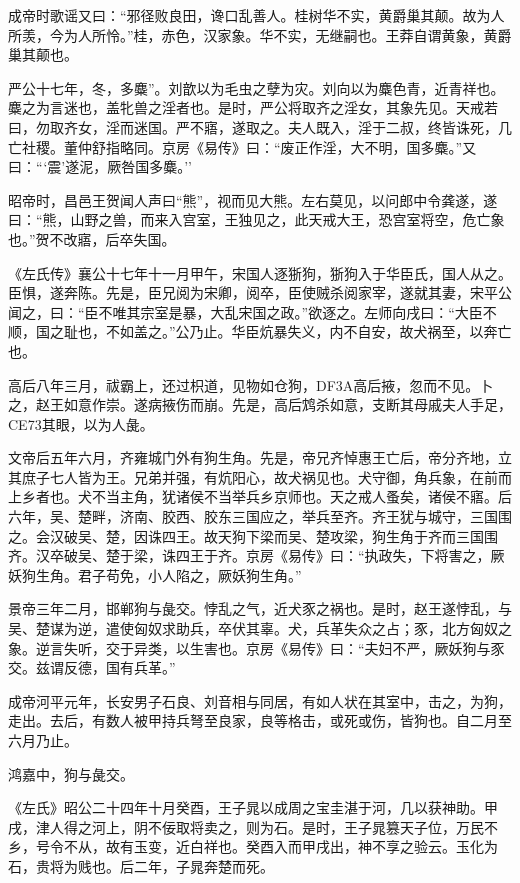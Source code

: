 \documentclass[]{article}
\begin{document}
成帝时歌谣又曰：``邪径败良田，谗口乱善人。桂树华不实，黄爵巢其颠。故为人所羡，今为人所怜。''桂，赤色，汉家象。华不实，无继嗣也。王莽自谓黄象，黄爵巢其颠也。

严公十七年，冬，多麋''。刘歆以为毛虫之孽为灾。刘向以为麋色青，近青祥也。麋之为言迷也，盖牝兽之淫者也。是时，严公将取齐之淫女，其象先见。天戒若曰，勿取齐女，淫而迷国。严不寤，遂取之。夫人既入，淫于二叔，终皆诛死，几亡社稷。董仲舒指略同。京房《易传》曰：``废正作淫，大不明，国多麋。''又曰：```震'遂泥，厥咎国多麋。''

昭帝时，昌邑王贺闻人声曰``熊''，视而见大熊。左右莫见，以问郎中令龚遂，遂曰：``熊，山野之兽，而来入宫室，王独见之，此天戒大王，恐宫室将空，危亡象也。''贺不改寤，后卒失国。

《左氏传》襄公十七年十一月甲午，宋国人逐狾狗，狾狗入于华臣氏，国人从之。臣惧，遂奔陈。先是，臣兄阅为宋卿，阅卒，臣使贼杀阅家宰，遂就其妻，宋平公闻之，曰：``臣不唯其宗室是暴，大乱宋国之政。''欲逐之。左师向戌曰：``大臣不顺，国之耻也，不如盖之。''公乃止。华臣炕暴失义，内不自安，故犬祸至，以奔亡也。

高后八年三月，祓霸上，还过枳道，见物如仓狗，DF3A高后掖，忽而不见。卜之，赵王如意作崇。遂病掖伤而崩。先是，高后鸩杀如意，支断其母戚夫人手足，CE73其眼，以为人彘。

文帝后五年六月，齐雍城门外有狗生角。先是，帝兄齐悼惠王亡后，帝分齐地，立其庶子七人皆为王。兄弟并强，有炕阳心，故犬祸见也。犬守御，角兵象，在前而上乡者也。犬不当主角，犹诸侯不当举兵乡京师也。天之戒人蚤矣，诸侯不寤。后六年，吴、楚畔，济南、胶西、胶东三国应之，举兵至齐。齐王犹与城守，三国围之。会汉破吴、楚，因诛四王。故天狗下梁而吴、楚攻梁，狗生角于齐而三国围齐。汉卒破吴、楚于梁，诛四王于齐。京房《易传》曰：``执政失，下将害之，厥妖狗生角。君子苟免，小人陷之，厥妖狗生角。''

景帝三年二月，邯郸狗与彘交。悖乱之气，近犬豕之祸也。是时，赵王遂悖乱，与吴、楚谋为逆，遣使匈奴求助兵，卒伏其辜。犬，兵革失众之占；豕，北方匈奴之象。逆言失听，交于异类，以生害也。京房《易传》曰：``夫妇不严，厥妖狗与豕交。兹谓反德，国有兵革。''

成帝河平元年，长安男子石良、刘音相与同居，有如人状在其室中，击之，为狗，走出。去后，有数人被甲持兵弩至良家，良等格击，或死或伤，皆狗也。自二月至六月乃止。

鸿嘉中，狗与彘交。

《左氏》昭公二十四年十月癸酉，王子晁以成周之宝圭湛于河，几以获神助。甲戌，津人得之河上，阴不佞取将卖之，则为石。是时，王子晁篡天子位，万民不乡，号令不从，故有玉变，近白祥也。癸酉入而甲戌出，神不享之验云。玉化为石，贵将为贱也。后二年，子晁奔楚而死。
\end{document}
